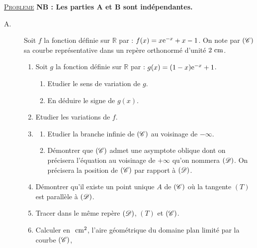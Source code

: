 \noindent \underline{\textsc{Probleme}} \newline
      \textbf{NB : Les parties A et B sont ind\'ependantes.}
      \begin{description}
            \item[A. ]
                  Soit $f$ la fonction d\'efinie sur $\mathbb{R}$ par : $f(x) = x \mathrm{e}^{-x} + x - 1$.
                  On note par $(\mathscr{C})$ sa courbe repr\'esentative dans un rep\`ere orthonorm\'e \Oij{} d'unit\'e $2~\mathrm{cm}$.
                  \begin{enumerate}
                        \item Soit $g$ la fonction d\'efinie sur $\mathbb{R}$ par : $g(x) = (1-x) \mathrm{e}^{-x} + 1$.
                              \begin{enumerate}
                                    \item Etudier le sens de variation de $g$.
                                    \item En d\'eduire le signe de $g(x)$.
                              \end{enumerate}
                        \item Etudier les variations de $f$.
                        \item \begin{enumerate}
                                    \item Etudier la branche infinie de $(\mathscr{C})$ au voisinage de $-\infty$.
                                    \item D\'emontrer que $(\mathscr{C})$ admet une asymptote oblique dont on pr\'ecisera
                                          l'\'equation au voisinage de $+\infty$ qu'on nommera $(\mathscr{D})$.
                                          On pr\'ecisera la position de $(\mathscr{C})$ par rapport \`a $(\mathscr{D})$.
                              \end{enumerate}
                        \item D\'emontrer qu'il existe un point unique $A$ de $(\mathscr{C})$ o\`u la tangente $(T)$ est 
                              parall\`ele \`a $(\mathscr{D})$.
                        \item Tracer dans le m\^eme rep\`ere $(\mathscr{D})$, $(T)$ et $(\mathscr{C})$.
                        \item Calculer en $~\mathrm{cm}^2$, l'aire g\'eom\'etrique du domaine plan limit\'e par la courbe $(\mathscr{C})$,

\end{enumerate}
\end{description}
